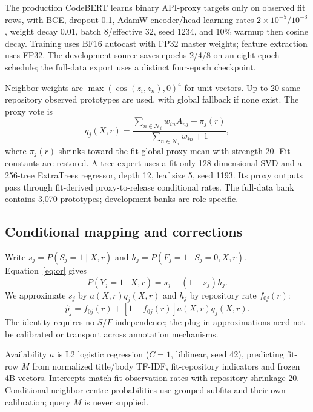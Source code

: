 \documentclass[10pt,conference]{IEEEtran}
\begin{document}
The production CodeBERT learns binary API-proxy targets only on observed fit rows, with BCE, dropout 0.1, AdamW encoder/head learning rates $2\!\times\!10^{-5}/10^{-3}$, weight decay 0.01, batch 8/effective 32, seed 1234, and 10\% warmup then cosine decay. Training uses BF16 autocast with FP32 master weights; feature extraction uses FP32. The development source saves epochs 2/4/8 on an eight-epoch schedule; the full-data export uses a distinct four-epoch checkpoint.

Neighbor weights are $\max(\cos(z_i,z_n),0)^4$ for unit vectors. Up to 20 same-repository observed prototypes are used, with global fallback if none exist. The proxy vote is
\begin{equation}
q_j(X,r)=\frac{\sum_{n\in\mathcal N_i}w_{in}A_{nj}+\pi_j(r)}
                  {\sum_{n\in\mathcal N_i}w_{in}+1}, \label{eq:vote}
\end{equation}
where $\pi_j(r)$ shrinks toward the fit-global proxy mean with strength 20. Fit constants are restored. A tree expert uses a fit-only 128-dimensional SVD and a 256-tree ExtraTrees regressor, depth 12, leaf size 5, seed 1193. Its proxy outputs pass through fit-derived proxy-to-release conditional rates. The full-data bank contains 3,070 prototypes; development banks are role-specific.

\subsection{Conditional mapping and corrections}
Write $s_j=P(S_j=1\mid X,r)$ and $h_j=P(F_j=1\mid S_j=0,X,r)$. Equation~\eqref{eq:or} gives
\begin{equation}
P(Y_j=1\mid X,r)=s_j+(1-s_j)h_j. \label{eq:identity}
\end{equation}
We approximate $s_j$ by $a(X,r)q_j(X,r)$ and $h_j$ by repository rate $f_{0j}(r)$:
\begin{equation}
\widehat p_j=f_{0j}(r)+[1-f_{0j}(r)]a(X,r)q_j(X,r). \label{eq:map}
\end{equation}
The identity requires no $S/F$ independence; the plug-in approximations need not be calibrated or transport across annotation mechanisms.

Availability $a$ is L2 logistic regression ($C=1$, liblinear, seed 42), predicting fit-row $M$ from normalized title/body TF-IDF, fit-repository indicators and frozen 4B vectors. Intercepts match fit observation rates with repository shrinkage 20. Conditional-neighbor centre probabilities use grouped subfits and their own calibration; query $M$ is never supplied.
\end{document}

